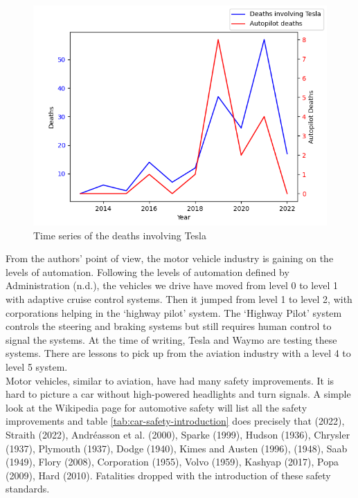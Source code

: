 \documentclass[
  man,floatsintext]{apa7}
\begin{document}
\begin{figure}

{\centering \includegraphics{./graphs/tesla_deaths} 

}

\caption{Time series of the deaths involving Tesla}\label{fig:tesla-deaths}
\end{figure}

From the authors' point of view, the motor vehicle industry is gaining on the levels of automation. Following the levels of automation defined by Administration (n.d.), the vehicles we drive have moved from level 0 to level 1 with adaptive cruise control systems. Then it jumped from level 1 to level 2, with corporations helping in the `highway pilot' system. The `Highway Pilot' system controls the steering and braking systems but still requires human control to signal the systems. At the time of writing, Tesla and Waymo are testing these systems. There are lessons to pick up from the aviation industry with a level 4 to level 5 system.\\

Motor vehicles, similar to aviation, have had many safety improvements. It is hard to picture a car without high-powered headlights and turn signals. A simple look at the Wikipedia page for automotive safety will list all the safety improvements and table \ref{tab:car-safety-introduction} does precisely that (2022), Straith (2022), Andréasson et al. (2000), Sparke (1999), Hudson (1936), Chrysler (1937), Plymouth (1937), Dodge (1940), Kimes and Austen (1996), (1948), Saab (1949), Flory (2008), Corporation (1955), Volvo (1959), Kashyap (2017), Popa (2009), Hard (2010). Fatalities dropped with the introduction of these safety standards.\\
\end{document}
